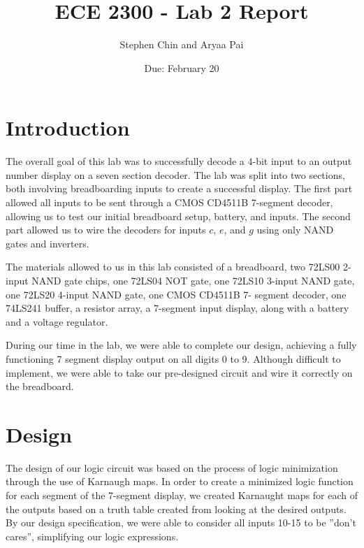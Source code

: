 \documentclass{article}
\title{ECE 2300 - Lab 2 Report}
\author{Stephen Chin and Aryaa Pai}
\date{Due: February 20}
\begin{document}
\maketitle

\section{Introduction}

The overall goal of this lab was to successfully decode a 4-bit
input to an output number display on a seven section decoder. The lab
was split into two sections, both involving breadboarding inputs to
create a successful display. The first part allowed all inputs to be
sent through a CMOS CD4511B 7-segment decoder, allowing us to test our
initial breadboard setup, battery, and inputs. The second part allowed
us to wire the decoders for inputs $c$, $e$, and $g$ using only NAND
gates and inverters.

The materials allowed to us in this lab consisted of a breadboard, two
72LS00 2-input NAND gate chips, one 72LS04 NOT gate, one 72LS10
3-input NAND gate, one 72LS20 4-input NAND gate, one CMOS CD4511B 7-
segment decoder, one 74LS241 buffer, a resistor array, a 7-segment
input display, along with a battery and a voltage regulator.

During our time in the lab, we were able to complete our design,
achieving a fully functioning 7 segment display output on all digits 0
to 9. Although difficult to implement, we were able to take our
pre-designed circuit and wire it correctly on the breadboard.


\section{Design}

The design of our logic circuit was based on the process of logic
minimization through the use of Karnaugh maps. In order to create a
minimized logic function for each segment of the 7-segment display, we
created Karnaught maps for each of the outputs based on a truth table
created from looking at the desired outputs. By our design
specification, we were able to consider all inputs 10-15 to be ''don't
cares'', simplifying our logic expressions.
\end{document}
